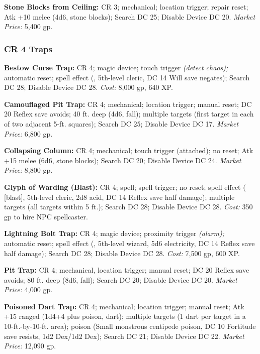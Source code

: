\textbf{Stone Blocks from Ceiling:} CR 3; mechanical; location trigger; repair 
reset; Atk +10 melee (4d6, stone blocks); Search DC 25; Disable Device DC 20. \textit{Market 
Price:} 5,400 gp.

\subsubsection{CR 4 Traps}

\textbf{Bestow Curse Trap:} CR 4; magic device; touch trigger 
\textit{(detect chaos); }automatic reset; spell effect (, 5th-level 
cleric, DC 14 Will save negates); Search DC 28; Disable Device DC 28. \textit{Cost: 
}8,000 gp, 640 XP.

\textbf{Camouflaged Pit Trap:} CR 4; mechanical; location trigger; manual reset; 
DC 20 Reflex save avoids; 40 ft. deep (4d6, fall); multiple targets (first target 
in each of two adjacent 5-ft. squares); Search DC 25; Disable Device DC 17. \textit{Market 
Price:} 6,800 gp. 

\textbf{Collapsing Column:} CR 4; mechanical; touch trigger (attached); no reset; 
Atk +15 melee (6d6, stone blocks); Search DC 20; Disable Device DC 24. \textit{Market 
Price:} 8,800 gp.

\textbf{Glyph of Warding (Blast):} CR 4; spell; spell trigger; 
no reset; spell effect ( [blast], 5th-level cleric, 2d8 
acid, DC 14 Reflex save half damage); multiple targets (all targets within 5 ft.); 
Search DC 28; Disable Device DC 28. \textit{Cost:} 350 gp to hire NPC spellcaster.

\textbf{Lightning Bolt Trap:} CR 4; magic device; proximity trigger 
\textit{(alarm); }automatic reset; spell effect (, 5th-level 
wizard, 5d6 electricity, DC 14 Reflex save half damage); Search DC 28; Disable 
Device DC 28. \textit{Cost:} 7,500 gp, 600 XP.

\textbf{Pit Trap:} CR 4; mechanical, location trigger; manual reset; DC 20 Reflex 
save avoids; 80 ft. deep (8d6, fall); Search DC 20; Disable Device DC 20. \textit{Market 
Price:} 4,000 gp.

\textbf{Poisoned Dart Trap:} CR 4; mechanical; location trigger; manual reset; 
Atk +15 ranged (1d4+4 plus poison, dart); multiple targets (1 dart per target in 
a 10-ft.-by-10-ft. area); poison (Small monstrous centipede poison, DC 10 Fortitude 
save resists, 1d2 Dex/1d2 Dex); Search DC 21; Disable Device DC 22. \textit{Market 
Price:} 12,090 gp.

